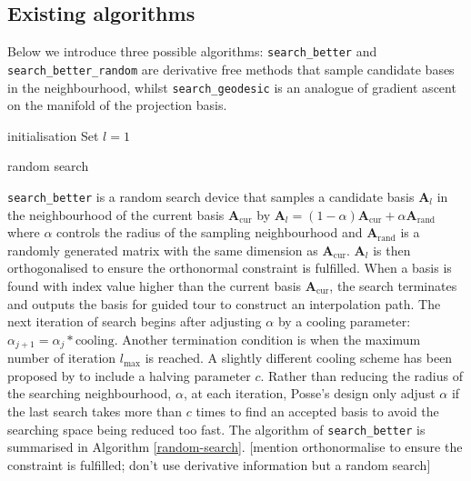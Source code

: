 \documentclass[12pt]{article}
\begin{document}
\hypertarget{existing-algorithms}{%
\subsection{Existing algorithms}\label{existing-algorithms}}

Below we introduce three possible algorithms: \texttt{search\_better} and \texttt{search\_better\_random} are derivative free methods that sample candidate bases in the neighbourhood, whilst \texttt{search\_geodesic} is an analogue of gradient ascent on the manifold of the projection basis.

\begin{algorithm}
\SetAlgoLined
  initialisation\;
  Set $l = 1$\;
  \caption{random search}
  \label{random-search}
\end{algorithm}

\texttt{search\_better} is a random search device that samples a candidate basis \(\mathbf{A}_{l}\) in the neighbourhood of the current basis \(\mathbf{A}_{\text{cur}}\) by \(\mathbf{A}_{l} = (1- \alpha)\mathbf{A}_{\text{cur}} + \alpha \mathbf{A}_{\text{rand}}\) where \(\alpha\) controls the radius of the sampling neighbourhood and \(\mathbf{A}_{\text{rand}}\) is a randomly generated matrix with the same dimension as \(\mathbf{A}_{\text{cur}}\). \(\mathbf{A}_{l}\) is then orthogonalised to ensure the orthonormal constraint is fulfilled. When a basis is found with index value higher than the current basis \(\mathbf{A}_{\text{cur}}\), the search terminates and outputs the basis for guided tour to construct an interpolation path. The next iteration of search begins after adjusting \(\alpha\) by a cooling parameter: \(\alpha_{j+1} = \alpha_j * \text{cooling}\). Another termination condition is when the maximum number of iteration \(l_{\max}\) is reached. A slightly different cooling scheme has been proposed by \citet{posse1995projection} to include a halving parameter \(c\). Rather than reducing the radius of the searching neighbourhood, \(\alpha\), at each iteration, Posse's design only adjust \(\alpha\) if the last search takes more than \(c\) times to find an accepted basis to avoid the searching space being reduced too fast. The algorithm of \texttt{search\_better} is summarised in Algorithm \ref{random-search}. {[}mention orthonormalise to ensure the constraint is fulfilled; don't use derivative information but a random search{]}
\end{document}
